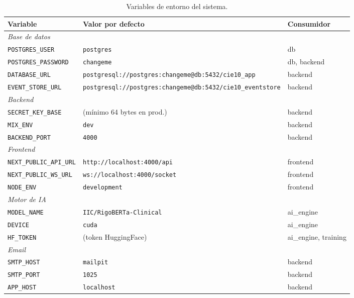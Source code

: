\begin{table}[h]
\centering
\caption{Variables de entorno del sistema.}
\label{tab:envvars}
\begin{tabular}{lp{6.5cm}l}
\hline
\textbf{Variable} & \textbf{Valor por defecto} & \textbf{Consumidor} \\
\hline
\multicolumn{3}{l}{\textit{Base de datos}} \\
\texttt{POSTGRES\_USER}      & \texttt{postgres}   & db \\
\texttt{POSTGRES\_PASSWORD}  & \texttt{changeme}   & db, backend \\
\texttt{DATABASE\_URL}       & \nolinkurl{postgresql://postgres:changeme@db:5432/cie10_app} & backend \\
\texttt{EVENT\_STORE\_URL}   & \nolinkurl{postgresql://postgres:changeme@db:5432/cie10_eventstore} & backend \\
\hline
\multicolumn{3}{l}{\textit{Backend}} \\
\texttt{SECRET\_KEY\_BASE}   & (mínimo 64 bytes en prod.) & backend \\
\texttt{MIX\_ENV}            & \texttt{dev}        & backend \\
\texttt{BACKEND\_PORT}       & \texttt{4000}       & backend \\
\hline
\multicolumn{3}{l}{\textit{Frontend}} \\
\texttt{NEXT\_PUBLIC\_API\_URL} & \texttt{http://localhost:4000/api} & frontend \\
\texttt{NEXT\_PUBLIC\_WS\_URL}  & \texttt{ws://localhost:4000/socket} & frontend \\
\texttt{NODE\_ENV}           & \texttt{development} & frontend \\
\hline
\multicolumn{3}{l}{\textit{Motor de IA}} \\
\texttt{MODEL\_NAME}         & \texttt{IIC/RigoBERTa-Clinical} & ai\_engine \\
\texttt{DEVICE}              & \texttt{cuda}       & ai\_engine \\
\texttt{HF\_TOKEN}           & (token HuggingFace) & ai\_engine, training \\
\hline
\multicolumn{3}{l}{\textit{Email}} \\
\texttt{SMTP\_HOST}          & \texttt{mailpit}    & backend \\
\texttt{SMTP\_PORT}          & \texttt{1025}       & backend \\
\texttt{APP\_HOST}           & \texttt{localhost}  & backend \\
\hline
\end{tabular}
\end{table}

